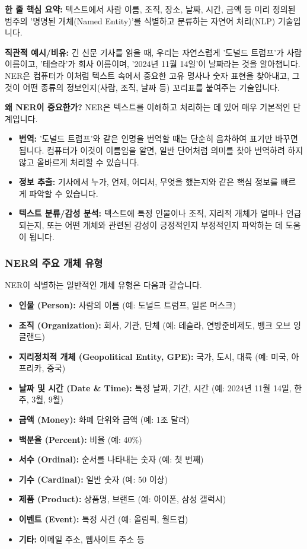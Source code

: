 \documentclass[11pt,a4paper]{article}
\begin{document}
\begin{conceptbox}
\textbf{한 줄 핵심 요약:} 텍스트에서 사람 이름, 조직, 장소, 날짜, 시간, 금액 등 미리 정의된 범주의 '명명된 개체(Named Entity)'를 식별하고 분류하는 자연어 처리(NLP) 기술입니다.
\end{conceptbox}

\textbf{직관적 예시/비유:}
긴 신문 기사를 읽을 때, 우리는 자연스럽게 '도널드 트럼프'가 사람 이름이고, '테슬라'가 회사 이름이며, '2024년 11월 14일'이 날짜라는 것을 알아챕니다. NER은 컴퓨터가 이처럼 텍스트 속에서 중요한 고유 명사나 숫자 표현을 찾아내고, 그것이 어떤 종류의 정보인지(사람, 조직, 날짜 등) 꼬리표를 붙여주는 기술입니다.

\textbf{왜 NER이 중요한가?}
NER은 텍스트를 이해하고 처리하는 데 있어 매우 기본적인 단계입니다.
\begin{itemize}
    \item \textbf{번역:} '도널드 트럼프'와 같은 인명을 번역할 때는 단순히 음차하여 표기만 바꾸면 됩니다. 컴퓨터가 이것이 이름임을 알면, 일반 단어처럼 의미를 찾아 번역하려 하지 않고 올바르게 처리할 수 있습니다.
    \item \textbf{정보 추출:} 기사에서 누가, 언제, 어디서, 무엇을 했는지와 같은 핵심 정보를 빠르게 파악할 수 있습니다.
    \item \textbf{텍스트 분류/감성 분석:} 텍스트에 특정 인물이나 조직, 지리적 개체가 얼마나 언급되는지, 또는 어떤 개체와 관련된 감성이 긍정적인지 부정적인지 파악하는 데 도움이 됩니다.
\end{itemize}

\subsubsection*{NER의 주요 개체 유형}
NER이 식별하는 일반적인 개체 유형은 다음과 같습니다.
\begin{itemize}
    \item \textbf{인물 (Person):} 사람의 이름 (예: 도널드 트럼프, 일론 머스크)
    \item \textbf{조직 (Organization):} 회사, 기관, 단체 (예: 테슬라, 연방준비제도, 뱅크 오브 잉글랜드)
    \item \textbf{지리정치적 개체 (Geopolitical Entity, GPE):} 국가, 도시, 대륙 (예: 미국, 아프리카, 중국)
    \item \textbf{날짜 및 시간 (Date \& Time):} 특정 날짜, 기간, 시간 (예: 2024년 11월 14일, 한 주, 3월, 9월)
    \item \textbf{금액 (Money):} 화폐 단위와 금액 (예: 1조 달러)
    \item \textbf{백분율 (Percent):} 비율 (예: 40\%)
    \item \textbf{서수 (Ordinal):} 순서를 나타내는 숫자 (예: 첫 번째)
    \item \textbf{기수 (Cardinal):} 일반 숫자 (예: 50 이상)
    \item \textbf{제품 (Product):} 상품명, 브랜드 (예: 아이폰, 삼성 갤럭시)
    \item \textbf{이벤트 (Event):} 특정 사건 (예: 올림픽, 월드컵)
\item \textbf{기타:} 이메일 주소, 웹사이트 주소 등
\end{itemize}
\end{document}
